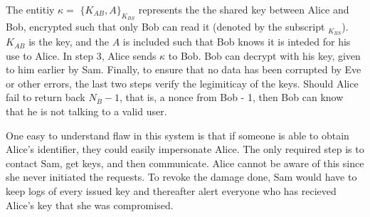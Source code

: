 The entitiy $\kappa = $ $\{K_{AB}, A\}_{K_{BS}}$ represents the the shared key 
between Alice and Bob, encrypted such that only Bob can read it (denoted by the
subscript $_{K_{BS}}$).
$K_{AB}$ is the key, and the $A$ is included such that Bob knows it is 
inteded for his use to Alice.
In step 3, Alice sends $\kappa$ to Bob. Bob can decrypt with his key, given
to him earlier by Sam. Finally, to ensure that no data has been corrupted
by Eve or other errors, the last two steps verify the legimiticay of the keys.
Should Alice fail to return back $N_{B} - 1$, that is, a nonce from Bob - 1,
then Bob can know that he is not talking to a valid user.

One easy to understand flaw in this system is that if someone is able 
to obtain Alice's identifier, they could easily impersonate Alice. 
The only required step is to contact Sam, get keys, and then communicate.
Alice cannot be aware of this since she never initiated the requests.
To revoke the damage done, Sam would have to keep logs of every issued key
and thereafter alert everyone who has recieved Alice's key that she 
was compromised.

